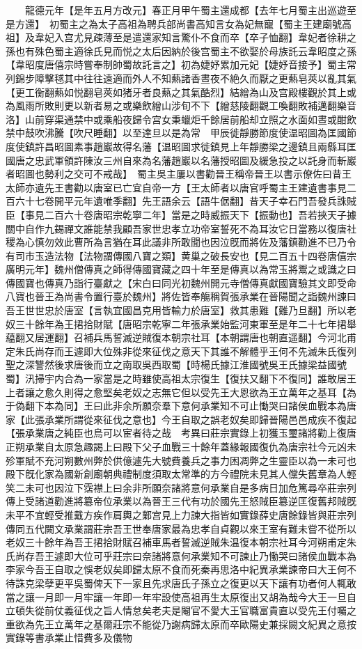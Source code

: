 　　龍德元年【是年五月方改元】春正月甲午蜀主還成都【去年七月蜀主出巡遊至是方還】　初蜀主之為太子高祖為聘兵部尚書高知言女為妃無寵【蜀主王建廟號高祖】及韋妃入宫尤見疎薄至是遣還家知言驚仆不食而卒【卒子恤翻】韋妃者徐耕之孫也有殊色蜀主適徐氏見而悦之太后因納於後宫蜀主不欲娶於母族託云韋昭度之孫【韋昭度唐僖宗時嘗奉制帥蜀故託言之】初為婕妤累加元妃【婕妤音接予】蜀主常列錦步障擊毬其中往往遠適而外人不知爇諸香晝夜不絶久而厭之更爇皂莢以亂其氣【更工衡翻爇如悦翻皂莢如猪牙者良爇之其氣酷烈】結繒為山及宫殿樓觀於其上或為風雨所敗則更以新者易之或樂飲繒山涉旬不下【繒慈陵翻觀工喚翻敗補邁翻樂音洛】山前穿渠通禁中或乘船夜歸令宫女秉蠟炬千餘居前船却立照之水面如晝或酣飲禁中鼓吹沸騰【吹尺睡翻】以至達旦以是為常　甲辰徙靜勝節度使温昭圖為匡國節度使鎮許昌昭圖素事趙巖故得名藩【温昭圖求徙鎮見上年靜勝梁之邊鎮且兩縣耳匡國唐之忠武軍領許陳汝三州自來為名藩趙巖以名藩授昭圖及緩急投之以託身而斬巖者昭圖也勢利之交可不戒哉】　蜀主吳主屢以書勸晉王稱帝晉王以書示僚佐曰昔王太師亦遺先王書勸以唐室已亡宜自帝一方【王太師者以唐官呼蜀主王建遺書事見二百六十七卷開平元年遺唯季翻】先王語余云【語牛倨翻】昔天子幸石門吾發兵誅賊臣【事見二百六十卷唐昭宗乾寧二年】當是之時威振天下【振動也】吾若挾天子據關中自作九錫禪文誰能禁我顧吾家世忠孝立功帝室誓死不為耳汝它日當務以復唐社稷為心慎勿效此曹所為言猶在耳此議非所敢聞也因泣旣而將佐及藩鎮勸進不已乃令有司市玉造法物【法物謂傳國八寶之類】黄巢之破長安也【見二百五十四卷唐僖宗廣明元年】魏州僧傳真之師得傳國寶藏之四十年至是傳真以為常玉將鬻之或識之曰傳國寶也傳真乃詣行臺獻之【宋白曰同光初魏州開元寺僧傳真獻國寶驗其文即受命八寶也晉王為尚書令置行臺於魏州】將佐皆奉觴稱賀張承業在晉陽聞之詣魏州諫曰吾王世世忠於唐室【言執宜國昌克用皆輸力於唐室】救其患難【難乃旦翻】所以老奴三十餘年為王捃拾財賦【唐昭宗乾寧二年張承業始監河東軍至是年二十七年捃舉藴翻又居運翻】召補兵馬誓滅逆賊復本朝宗社耳【本朝謂唐也朝直遥翻】今河北甫定朱氏尚存而王遽即大位殊非從來征伐之意天下其誰不解體乎王何不先滅朱氏復列聖之深讐然後求唐後而立之南取吳西取蜀【時楊氏據江淮國號吳王氏據梁益國號蜀】汛掃宇内合為一家當是之時雖使高祖太宗復生【復扶又翻下不復同】誰敢居王上者讓之愈久則得之愈堅矣老奴之志無它但以受先王大恩欲為王立萬年之基耳【為于偽翻下本為同】王曰此非余所願奈羣下意何承業知不可止慟哭曰諸侯血戰本為唐家【此張承業所謂從來征伐之意也】今王自取之誤老奴矣即歸晉陽邑邑成疾不復起【張承業唐之純臣也烏可以宦者待之哉　考異曰莊宗實錄上初獲玉璽諸將勸上復唐正朔承業自太原急趣謁上曰殿下父子血戰三十餘年蓋緣報國復仇為唐宗社今元凶未殄軍賦不充河朔數州弊於供億遽先大號費養兵之事力困凋弊之生靈臣以為一未可也殿下旣化家為國新創廟朝典禮制度須取太常準的方今禮院未見其人儻失舊章為人輕笑二未可也因泣下霑襟上曰余非所願奈諸將意何承業自是多病日加危篤尋卒莊宗列傳上受諸道勸進將簒帝位承業以為晉王三代有功於國先王怒賊臣簒逆匡復舊邦賊旣未平不宜輕受推戴方疾作肩輿之鄴宫見上力諫大指皆如實錄薛史唐餘錄皆與莊宗列傳同五代闕文承業謂莊宗吾王世奉唐家最為忠孝自貞觀以來王室有難未嘗不從所以老奴三十餘年為吾王捃拾財賦召補車馬者誓滅逆賊朱温復本朝宗社耳今河朔甫定朱氏尚存吾王遽即大位可乎莊宗曰奈諸將意何承業知不可諫止乃慟哭曰諸侯血戰本為李家今吾王自取之悞老奴矣即歸太原不食而死秦再思洛中紀異承業諫帝曰大王何不待誅克梁孽更平吳蜀俾天下一家且先求唐氏子孫立之復更以天下讓有功者何人輒敢當之讓一月即一月牢讓一年即一年牢設使高祖再生太原復出又胡為哉今大王一旦自立頓失從前仗義征伐之旨人情怠矣老夫是閹官不愛大王官職富貴直以受先王付囑之重欲為先王立萬年之基爾莊宗不能從乃謝病歸太原而卒歐陽史兼採闕文紀異之意按實錄等書承業止惜費多及儀物